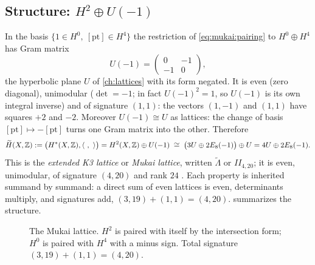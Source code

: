 \subsection{Structure: \texorpdfstring{$H^2\oplus U(-1)$}{H2 + U(-1)}}
In the basis $\{1\in H^0,\ [\mathrm{pt}]\in H^4\}$ the restriction of \eqref{eq:mukai:pairing} to
$H^0\oplus H^4$ has Gram matrix
\begin{equation}\label{eq:mukai:uneg}
  U(-1)=\begin{pmatrix}0&-1\\-1&0\end{pmatrix},
\end{equation}
the hyperbolic plane $U$ of \cref{ch:lattices} with its form negated.
It is even (zero diagonal), unimodular ($\det=-1$; in fact $U(-1)^2=1$, so $U(-1)$ is its own
integral inverse) and of signature $(1,1)$: the vectors $(1,-1)$ and $(1,1)$ have squares
$+2$ and $-2$. Moreover $U(-1)\cong U$ as lattices: the change of basis
$[\mathrm{pt}]\mapsto-[\mathrm{pt}]$ turns one Gram matrix into the other. Therefore
\begin{equation}\label{eq:mukai:decomp}
  \widetilde H(X,\mathbb{Z}):=\bigl(H^*(X,\mathbb{Z}),\langle\ ,\ \rangle\bigr)
  = H^2(X,\mathbb{Z})\oplus U(-1)\;\cong\;\bigl(3U\oplus2E_8(-1)\bigr)\oplus U=4U\oplus 2E_8(-1).
\end{equation}
This is the \emph{extended K3 lattice} or \emph{Mukai lattice}, written $\widetilde\Lambda$ or
$II_{4,20}$; it is even, unimodular, of signature $(4,20)$ and rank $24$
. Each property is
inherited summand by summand: a direct sum of even lattices is even, determinants multiply, and
signatures add, $(3,19)+(1,1)=(4,20)$.  summarizes the structure.

\begin{figure}[ht]
\centering
{}
\caption{The Mukai lattice. $H^2$ is paired with itself by the intersection form; $H^0$ is
paired with $H^4$ with a minus sign. Total signature $(3,19)+(1,1)=(4,20)$.}
\label{fig:mukai:decomp}
\end{figure}

